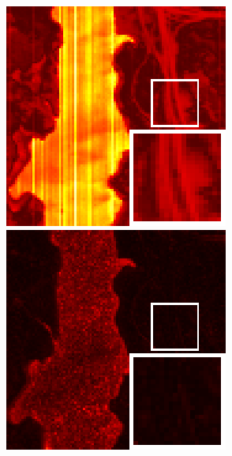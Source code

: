 \begin{figure}[t]
\begin{center}
\begin{minipage}{0.15\hsize}
		\end{minipage}
		\begin{minipage}{0.15\hsize}
			\centerline{\includegraphics[width=\hsize]{./fig_supplement/SAM_map_color_woboundary/JasperRidge/sam_map_FastHyMix.eps}} %
		\end{minipage}
		\begin{minipage}{0.15\hsize}
			\centerline{\includegraphics[width=\hsize]{./fig_supplement/SAM_map_color_woboundary/JasperRidge/sam_map_S3TTV.eps}} %
		\end{minipage}
		\begin{minipage}{0.050\hsize}
			\centerline{\hspace{\hsize}} %
		\end{minipage}
		

\end{center}
\end{figure}
